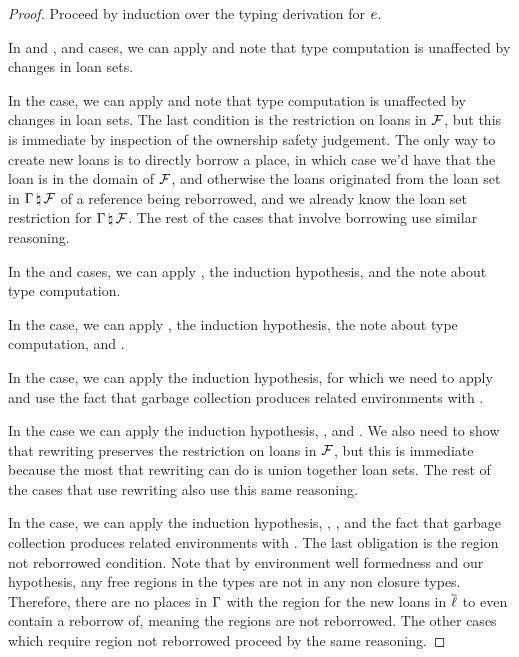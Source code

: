 \begin{proof}
  Proceed by induction over the typing derivation for $e$.

  In  and , and  cases, we can apply
   and note that type computation is
  unaffected by changes in loan sets.

  In the  case, we can apply
   and note that type computation is
  unaffected by changes in loan sets. The last condition is the restriction on
  loans in $\mathcal{F}$, but this is immediate by inspection of the ownership
  safety judgement. The only way to create new loans is to directly borrow a
  place, in which case we'd have that the loan is in the domain of $\mathcal{F}$,
  and otherwise the loans originated from the loan set in
  $\Gamma \, \natural \, \mathcal{F}$ of a reference being reborrowed, and we
  already know the loan set restriction for $\Gamma \, \natural \, \mathcal{F}$.
  The rest of the cases that involve borrowing use similar reasoning.

  In the  and  cases, we can apply
  , the induction hypothesis, and the
  note about type computation.

  In the  case, we can apply
  , the induction hypothesis, the note
  about type computation, and .

  In the  case, we can apply the induction hypothesis, for which
  we need to apply  and use the fact
  that garbage collection produces related environments with
  .

  In the  case we can apply the induction hypothesis,
  , and
  . We also need to show that
  rewriting preserves the restriction on loans in $\mathcal{F}$, but this is
  immediate because the most that rewriting can do is union together loan sets.
  The rest of the cases that use rewriting also use this same reasoning.

  In the  case, we can apply the induction hypothesis,
  ,
  , and the fact that garbage collection
  produces related environments with
  . The last obligation is the region
  not reborrowed condition. Note that by environment well formedness and our
  hypothesis, any free regions in the types are not in any non closure types.
  Therefore, there are no places in $\Gamma$ with the region for the new
  loans in $\overline{\ell}$ to even contain a reborrow of, meaning the regions are not
  reborrowed. The other cases which require region not reborrowed proceed by the
  same reasoning.


\end{proof}
